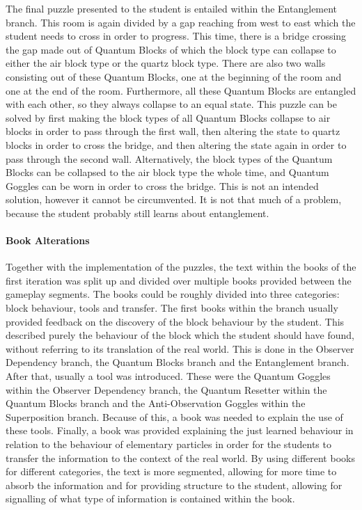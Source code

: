 \documentclass[11pt,twoside]{report} %
\begin{document}
The final puzzle presented to the student is entailed within the Entanglement branch. This room is again divided by a gap reaching from west to east which the student needs to cross in order to progress. This time, there is a bridge crossing the gap made out of Quantum Blocks of which the block type can collapse to either the air block type or the quartz block type. There are also two walls consisting out of these Quantum Blocks, one at the beginning of the room and one at the end of the room. Furthermore, all these Quantum Blocks are entangled with each other, so they always collapse to an equal state. This puzzle can be solved by first making the block types of all Quantum Blocks collapse to air blocks in order to pass through the first wall, then altering the state to quartz blocks in order to cross the bridge, and then altering the state again in order to pass through the second wall. Alternatively, the block types of the Quantum Blocks can be collapsed to the air block type the whole time, and Quantum Goggles can be worn in order to cross the bridge. This is not an intended solution, however it cannot be circumvented. It is not that much of a problem, because the student probably still learns about entanglement.

\paragraph{Book Alterations}

Together with the implementation of the puzzles, the text within the books of the first iteration was split up and divided over multiple books provided between the gameplay segments. The books could be roughly divided into three categories: block behaviour, tools and transfer. The first books within the branch usually provided feedback on the discovery of the block behaviour by the student. This described purely the behaviour of the block which the student should have found, without referring to its translation of the real world. This is done in the Observer Dependency branch, the Quantum Blocks branch and the Entanglement branch. After that, usually a tool was introduced. These were the Quantum Goggles within the Observer Dependency branch, the Quantum Resetter within the Quantum Blocks branch and the Anti-Observation Goggles within the Superposition branch. Because of this, a book was needed to explain the use of these tools. Finally, a book was provided explaining the just learned behaviour in relation to the behaviour of elementary particles in order for the students to transfer the information to the context of the real world. By using different books for different categories, the text is more segmented, allowing for more time to absorb the information and for providing structure to the student, allowing for signalling of what type of information is contained within the book.
\end{document}
